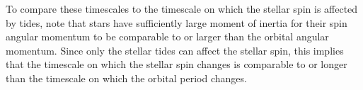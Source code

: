 To compare these timescales to the timescale on which the stellar spin is
affected by tides, note that stars have sufficiently large moment of inertia
for their spin angular momentum to be comparable to or larger than the orbital
angular momentum. Since only the stellar tides can affect the stellar spin, this
implies that the timescale on which the stellar spin changes is comparable to or
longer than the timescale on which the orbital period changes.
